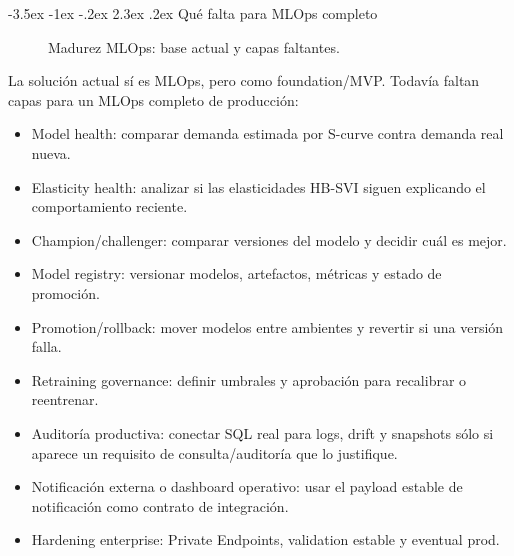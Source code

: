 \documentclass[11pt,letterpaper]{article}
\makeatletter
\renewcommand\section{\@startsection{section}{1}{\z@}
  {-3.5ex \@plus -1ex \@minus -.2ex}
  {2.3ex \@plus .2ex}
  {\Large\bfseries\sffamily\color{azulTec}}}
\makeatother
\begin{document}
\section{Qué falta para MLOps completo}

\begin{figure}[htbp]
  \centering
  \caption{Madurez MLOps: base actual y capas faltantes.}
\end{figure}

La solución actual sí es MLOps, pero como foundation/MVP. Todavía faltan capas para un MLOps completo de producción:

\begin{itemize}
  \item Model health: comparar demanda estimada por S-curve contra demanda real nueva.
  \item Elasticity health: analizar si las elasticidades HB-SVI siguen explicando el comportamiento reciente.
  \item Champion/challenger: comparar versiones del modelo y decidir cuál es mejor.
  \item Model registry: versionar modelos, artefactos, métricas y estado de promoción.
  \item Promotion/rollback: mover modelos entre ambientes y revertir si una versión falla.
  \item Retraining governance: definir umbrales y aprobación para recalibrar o reentrenar.
  \item Auditoría productiva: conectar SQL real para logs, drift y snapshots sólo si aparece un requisito de consulta/auditoría que lo justifique.
  \item Notificación externa o dashboard operativo: usar el payload estable de notificación como contrato de integración.
  \item Hardening enterprise: Private Endpoints, validation estable y eventual prod.
\end{itemize}
\end{document}

